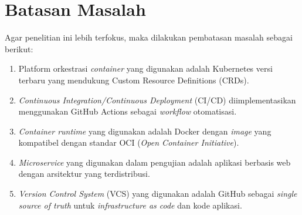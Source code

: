 \vspace{0.5cm}
\section{Batasan Masalah}
Agar penelitian ini lebih terfokus, maka dilakukan pembatasan masalah sebagai
berikut:
\begin{enumerate}[label=\alph*., leftmargin=1.5\parindent]
  \item Platform orkestrasi \textit{container} yang digunakan adalah Kubernetes versi
        terbaru yang mendukung Custom Resource Definitions (CRDs).
  \item \textit{Continuous Integration/Continuous Deployment} (CI/CD) diimplementasikan menggunakan GitHub Actions sebagai \textit{workflow} otomatisasi.
  \item \textit{Container runtime} yang digunakan adalah Docker dengan \textit{image} yang kompatibel dengan standar OCI (\textit{Open Container Initiative}).
  \item \textit{Microservice} yang digunakan dalam pengujian adalah aplikasi berbasis web dengan arsitektur yang terdistribusi.
  \item \textit{Version Control System} (VCS) yang digunakan adalah GitHub sebagai \textit{single source of truth} untuk \textit{infrastructure as code} dan kode aplikasi.
\end{enumerate}
\newpage
